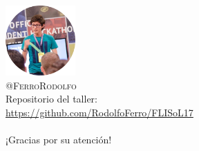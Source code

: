 \documentclass[usenames,dvipsnames]{beamer}
\begin{document}
  \begin{frame}[standout]
    \includegraphics[width=0.2\textwidth]{imgs/me}\\
    {\color{Turquoise} \textsc{@FerroRodolfo}}\\
    Repositorio del taller:\\
    {\color{orange} \url{https://github.com/RodolfoFerro/FLISoL17}}\\
    \vspace*{0.3cm}
    \noindent {\color{white} \rule{0.3\linewidth}{1mm} }\\
    \vspace*{0.3cm}
    ¡Gracias por su atención!
  \end{frame}
\end{document}
